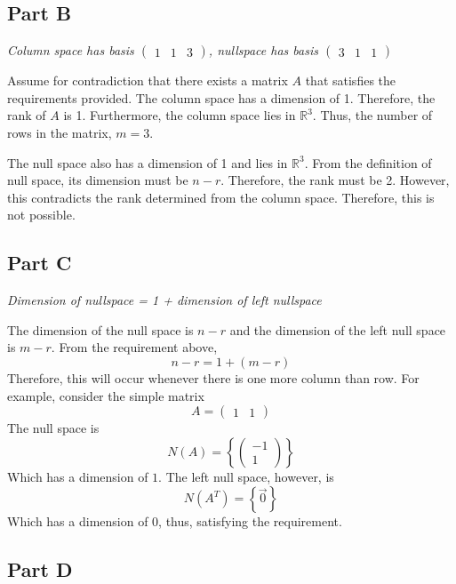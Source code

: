 \documentclass{article}
\begin{document}
\subsection*{Part B}

\textit{Column space has basis $\begin{pmatrix} 1 & 1 & 3 \end{pmatrix}$,
nullspace has basis $\begin{pmatrix} 3 & 1 & 1 \end{pmatrix}$}

\bigbreak

Assume for contradiction that there exists a matrix $ A $ that satisfies
the requirements provided. The column space has a dimension of 1. Therefore,
the rank of $ A $ is 1. Furthermore, the column space lies in $ \mathbb{R}^3
$. Thus, the number of rows in the matrix, $ m = 3 $.

The null space also has a dimension of 1 and lies in $ \mathbb{R}^3 $. From
the definition of null space, its dimension must be $ n - r $. Therefore, the
rank must be 2. However, this contradicts the rank determined from the column
space. Therefore, this is not possible.

\subsection*{Part C}

\textit{Dimension of nullspace = 1 + dimension of left nullspace}

\bigbreak

The dimension of the null space is $ n - r $ and the dimension of the left
null space is $ m - r $. From the requirement above,
$$ n - r = 1 + (m - r) $$
Therefore, this will occur whenever there is one more column than row. For
example, consider the simple matrix
$$ A = \begin{pmatrix}
    1 & 1 
\end{pmatrix} $$
The null space is
$$ N(A) = \left\{ \begin{pmatrix}
    -1 \\
    1
\end{pmatrix} \right\} $$
Which has a dimension of $ 1 $. The left null space, however, is
$$ N(A^T) = \left\{ \vec{0} \right\} $$
Which has a dimension of $ 0 $, thus, satisfying the requirement.

\subsection*{Part D}
\end{document}
